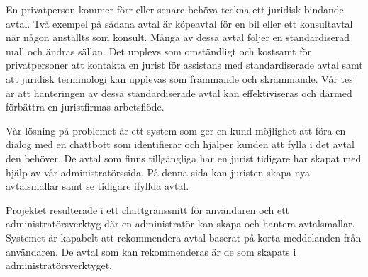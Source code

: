\documentclass[a4paper,12pt]{article}
\begin{document}
\begin{sammanfattning}
En privatperson kommer förr eller senare behöva teckna ett juridisk bindande avtal. Två exempel på sådana avtal är köpeavtal för en bil eller ett konsultavtal när någon anställts som konsult. Många av dessa avtal följer en standardiserad mall och ändras sällan. Det upplevs som omständligt och kostsamt för privatpersoner att kontakta en jurist för assistans med standardiserade avtal samt att juridisk terminologi kan upplevas som främmande och skrämmande. Vår tes är att hanteringen av dessa standardiserade avtal kan effektiviseras och därmed förbättra en juristfirmas arbetsflöde.

Vår lösning på problemet är ett system som ger en kund möjlighet att föra en dialog med en chattbott som identifierar och hjälper kunden att fylla i det avtal den behöver.
De avtal som finns tillgängliga har en jurist tidigare har skapat med hjälp av vår administratörssida. På denna sida kan juristen skapa nya avtalsmallar samt se tidigare ifyllda avtal.

Projektet resulterade i ett chattgränssnitt för användaren och ett administratörsverktyg där en administratör kan skapa och hantera avtalsmallar. Systemet är kapabelt att rekommendera avtal baserat på korta meddelanden från användaren. De avtal som kan rekommenderas är de som skapats i administratörsverktyget.




\end{sammanfattning}

\tableofcontents


\cleardoublepage


\mainmatter

\end{document}
